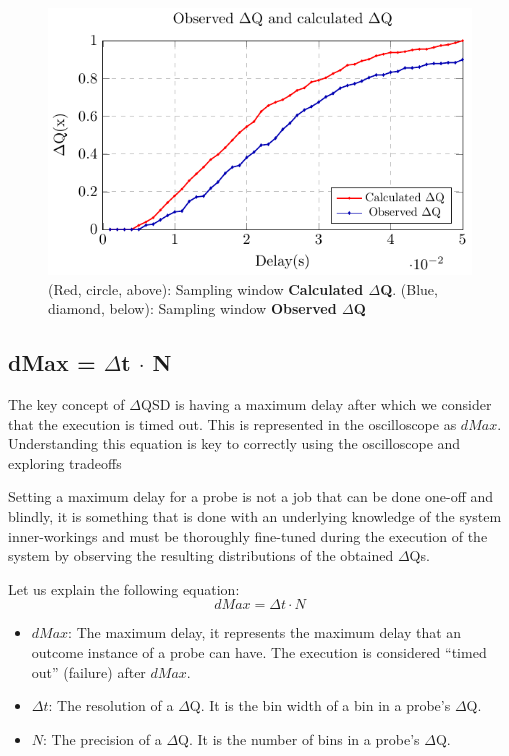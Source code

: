     \begin{figure}[H]
            \begin{center}
                \includegraphics[scale=1]{tikz/obs_calc.pdf} 
            \end{center}
            \caption{(Red, circle, above): Sampling window \textbf{Calculated $\Delta$Q}. (Blue, diamond, below): Sampling window \textbf{Observed $\Delta$Q}}
        \end{figure}

    \subsection{dMax = $\Delta$t $\cdot$ N}
        The key concept of $\Delta$QSD is having a maximum delay after which we consider that the execution is timed out. This is represented in the oscilloscope as $dMax$. Understanding this equation is key to correctly using the oscilloscope and exploring tradeoffs

Setting a maximum delay for a probe is not a job that can be done one-off and blindly, it is something that is done with an underlying knowledge of the system inner-workings and must be thoroughly fine-tuned during the execution of the system by observing the resulting distributions of the obtained $\Delta$Qs. 

Let us explain the following equation:
\begin{equation}
    dMax = \Delta t \cdot N  
    \label{eq:dMaxU}
\end{equation}

    \begin{itemize}
        \item $dMax$: The maximum delay, it represents the maximum delay that an outcome instance of a probe can have. The execution is considered ``timed out'' (failure) after $dMax$.
        \item $\Delta t$: The resolution of a $\Delta$Q. It is the bin width of a bin in a probe's $\Delta$Q.
        \item $N$: The precision of a $\Delta$Q. It is the number of bins in a probe's $\Delta$Q.
    \end{itemize}
    
